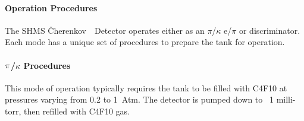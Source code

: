 \documentclass[12pt]{article}
\newcommand{\Cerenkov}{\v{C}herenkov~}
\begin{document}
{\color{red}


\paragraph{Operation Procedures}
% 
% 
The SHMS \Cerenkov\ Detector operates either as an $\pi$/$\kappa$ e/$\pi$ or
discriminator. Each mode has a unique set of procedures to prepare the tank
for operation. 



\paragraph{$\bf{\pi}$/$\kappa$ Procedures}
This mode of operation typically requires the tank to be filled with C4F10
at pressures varying from 0.2 to 1~Atm. The detector is pumped down to ~1 milli-torr, then refilled with C4F10 gas.

}
\end{document}
